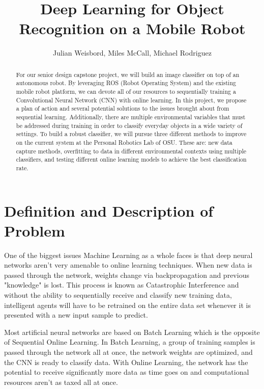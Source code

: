\documentclass[a4paper, 10pt]{article}
\title{Deep Learning for Object Recognition on a Mobile Robot}
\author{Julian Weisbord, Miles McCall, Michael Rodriguez}
\begin{document}
\maketitle

\begin{abstract}

For our senior design capstone project, we will build an image classifier on top of an autonomous robot. By leveraging ROS (Robot Operating System)  and the existing mobile robot platform, we can devote all of our resources to sequentially training a Convolutional Neural Network (CNN) with online learning. In this project, we propose a plan of action and several potential solutions to the issues brought about from sequential learning. Additionally, there are multiple environmental variables that must be addressed during training in order to classify everyday objects in a wide variety of settings. To build a robust classifier, we will pursue three different methods to improve on the current system at the Personal Robotics Lab of OSU. These are: new data capture methods, overfitting to data in different environmental contexts using multiple classifiers, and testing different online learning models to achieve the best classification rate.
\end{abstract}

\newpage

\section{Definition and Description of Problem}

One of the biggest issues Machine Learning as a whole faces is that deep neural networks aren't very amenable to online learning techniques. When new data is passed through the network, weights change via backpropagation and previous "knowledge" is lost. This process is known as Catastrophic Interference and without the ability to sequentially receive and classify new training data, intelligent agents will have to be retrained on the entire data set whenever it is presented with a new input sample to predict. 
	
Most artificial neural networks are based on Batch Learning which is the opposite of Sequential Online Learning. In Batch Learning, a group of training samples is passed through the network all at once, the network weights are optimized, and the CNN is ready to classify data. With Online Learning,  the network has the potential to receive significantly more data as time goes on and computational resources aren't as taxed all at once.
	
\end{document}
